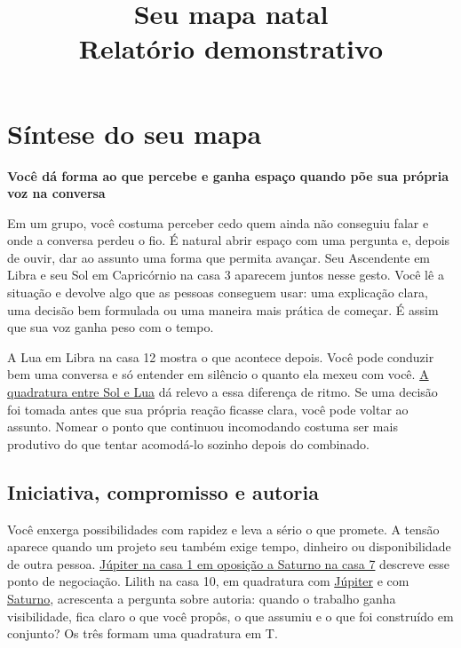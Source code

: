 \documentclass[11pt,a4paper]{article}
\title{Seu mapa natal\\\large Relatório demonstrativo}
\author{}
\date{}
\newcommand{\subtituloleitura}[1]{\textbf{#1}\par\nopagebreak[4]}
\newcommand{\aspectoref}[2]{\hyperref[#1]{#2}}
\begin{document}
\maketitle

\tableofcontents

\clearpage

\section{Síntese do seu mapa}
\subtituloleitura{Você dá forma ao que percebe e ganha espaço quando põe sua própria voz na conversa}

Em um grupo, você costuma perceber cedo quem ainda não conseguiu falar e onde a conversa perdeu o fio. É natural abrir espaço com uma pergunta e, depois de ouvir, dar ao assunto uma forma que permita avançar. Seu Ascendente em Libra e seu Sol em Capricórnio na casa 3 aparecem juntos nesse gesto. Você lê a situação e devolve algo que as pessoas conseguem usar: uma explicação clara, uma decisão bem formulada ou uma maneira mais prática de começar. É assim que sua voz ganha peso com o tempo.

A Lua em Libra na casa 12 mostra o que acontece depois. Você pode conduzir bem uma conversa e só entender em silêncio o quanto ela mexeu com você. \aspectoref{aspecto:sol-lua}{A quadratura entre Sol e Lua} dá relevo a essa diferença de ritmo. Se uma decisão foi tomada antes que sua própria reação ficasse clara, você pode voltar ao assunto. Nomear o ponto que continuou incomodando costuma ser mais produtivo do que tentar acomodá-lo sozinho depois do combinado.

\subsection{Iniciativa, compromisso e autoria}

Você enxerga possibilidades com rapidez e leva a sério o que promete. A tensão aparece quando um projeto seu também exige tempo, dinheiro ou disponibilidade de outra pessoa. \aspectoref{aspecto:jupiter-saturno}{Júpiter na casa 1 em oposição a Saturno na casa 7} descreve esse ponto de negociação. Lilith na casa 10, em quadratura com \aspectoref{aspecto:lilith-jupiter}{Júpiter} e com \aspectoref{aspecto:lilith-saturno}{Saturno}, acrescenta a pergunta sobre autoria: quando o trabalho ganha visibilidade, fica claro o que você propôs, o que assumiu e o que foi construído em conjunto? Os três formam uma quadratura em T.
\end{document}
